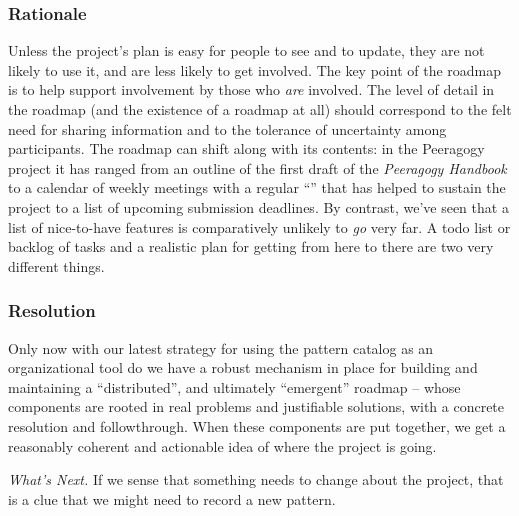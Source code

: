 \subsubsection*{Rationale} Unless the project's plan is easy for people to see and to update, they are not likely to use it, and are less likely to get involved.  The key point of the roadmap is to help support involvement by those who \emph{are} involved.   The level of detail in the roadmap (and the existence of a roadmap at all) should correspond to the felt need for sharing information and to the tolerance of uncertainty among participants.
The roadmap can shift along with its contents: in the Peeragogy
project it has ranged from an outline of the first draft of the
\emph{Peeragogy Handbook} to a calendar of weekly meetings with a
regular ``'' that has helped to sustain the
project to a list of upcoming submission deadlines.  By contrast,
we've seen that a list of nice-to-have features is comparatively
unlikely to \emph{go} very far.  A todo list or backlog of tasks and a realistic
plan for getting from here to there are two very different things.

\subsubsection*{Resolution}
Only now with our latest strategy for using the pattern catalog as an
organizational tool do we have a robust mechanism in place for
building and maintaining a ``distributed'', and ultimately
``emergent'' roadmap -- whose components are rooted in real problems
and justifiable solutions, with a concrete resolution and
followthrough.  When these components are put together, we get a
reasonably coherent and actionable idea of where the project is going.

\begin{framed}
\emph{What's Next.}
If we sense that something needs to change about the project, that is a clue that we might need to record a new pattern.
\end{framed}


    
    
    
    
    
    
    
    
    
